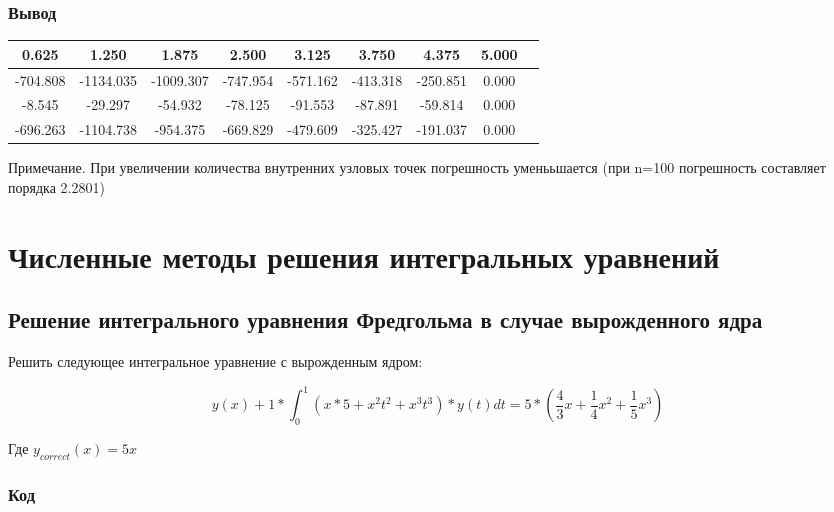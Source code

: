 \documentclass[bachelor, och, pract]{SCWorks}
\begin{document}
\subsubsection{Вывод}


\begin{table}[H]
    \centering
    \begin{tabular}{|c|c|c|c|c|c|c|c|c|}
\hline 0.625 & 1.250  & 1.875 &    2.500  & 3.125 & 3.750  &4.375  &      5.000\\\hline
-704.808  & -1134.035 & -1009.307 & -747.954  & -571.162 &-413.318 &       -250.851  &  0.000\\\hline
-8.545 & -29.297 & -54.932 & -78.125&-91.553&  -87.891&   -59.814 &              0.000\\\hline
-696.263 & -1104.738 & -954.375 & -669.829 & -479.609 & -325.427 &           -191.037   &  0.000\\\hline
    \end{tabular}
\end{table}

Примечание. При увеличении количества внутренних узловых точек погрешность уменььшается (при n=100 погрешность составляет порядка 2.2801)


\section{Численные методы решения интегральных уравнений}

\subsection{Решение интегрального уравнения Фредгольма в случае
вырожденного ядра}

Решить следующее интегральное уравнение с вырожденным ядром:

$$y(x) + 1 * \int_{0}^{1}(x * 5 + x^2t^2 + x^3t^3) * y(t)dt = 5 * (\frac{4}{3}x + \frac{1}{4}x^2 + \frac{1}{5}x^3)$$

Где $y_{correct}(x) = 5x$


\subsubsection{Код}
\end{document}
